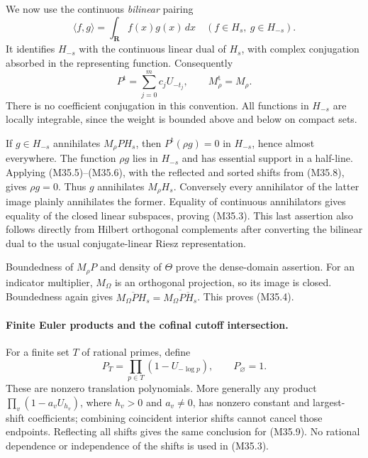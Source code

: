 We now use the continuous \emph{bilinear} pairing
\[
            \langle f,g\rangle=\int_{\mathbf R}f(x)g(x)\,dx
             \quad (f\in H_s,\ g\in H_{-s}).
 \tag{M35.7}
\]
It identifies $H_{-s}$ with the continuous linear dual
of $H_s$, with complex conjugation absorbed in the
representing function.  Consequently
\[
              P^{\mathrm t}=\sum_{j=0}^{m}c_jU_{-t_j},
              \qquad M_\rho^{\mathrm t}=M_\rho.
 \tag{M35.8}
\]
There is no coefficient conjugation in this convention.
All functions in $H_{-s}$ are locally integrable, since
the weight is bounded above and below on compact sets.

If $g\in H_{-s}$ annihilates $M_\rho PH_s$, then
$P^{\mathrm t}(\rho g)=0$ in $H_{-s}$, hence almost
everywhere.  The function $\rho g$ lies in $H_{-s}$ and
has essential support in a half-line.  Applying
(M35.5)--(M35.6), with the reflected and sorted shifts
from (M35.8), gives $\rho g=0$.  Thus $g$ annihilates
$M_\rho H_s$.  Conversely every annihilator of the
latter image plainly annihilates the former.  Equality
of continuous annihilators gives equality of the closed
linear subspaces, proving (M35.3).  This last assertion
also follows directly from Hilbert orthogonal
complements after converting the bilinear dual to the
usual conjugate-linear Riesz representation.

Boundedness of $M_\rho P$ and density of $\Theta$ prove
the dense-domain assertion.  For an indicator multiplier,
$M_\Omega$ is an orthogonal projection, so its image is
closed.  Boundedness again gives
$\overline{M_\Omega PH_s}=
\overline{M_\Omega\overline{PH_s}}$.
This proves (M35.4).

\paragraph{Finite Euler products and the cofinal cutoff intersection.}
For a finite set $T$ of rational primes, define
\[
                P_T=\prod_{p\in T}(1-U_{-\log p}),
                   \qquad P_\varnothing=1.
 \tag{M35.9}
\]
These are nonzero translation polynomials.  More generally
any product $\prod_v(1-a_vU_{h_v})$, where $h_v>0$ and
$a_v\ne0$, has nonzero constant and largest-shift
coefficients; combining coincident interior shifts cannot
cancel those endpoints.  Reflecting all shifts gives the
same conclusion for (M35.9).  No rational dependence or
independence of the shifts is used in (M35.3).

